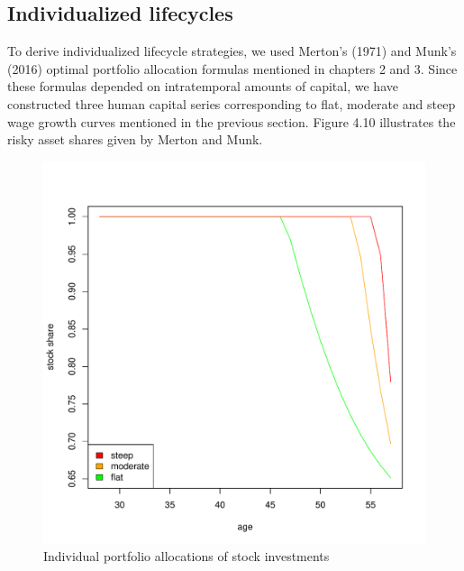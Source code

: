 \subsection{Individualized lifecycles}

To derive individualized lifecycle strategies, we used Merton's (1971) and Munk's (2016) optimal portfolio allocation formulas mentioned in chapters 2 and 3. Since these formulas depended on intratemporal amounts of capital, we have constructed three human capital series corresponding to flat, moderate and steep wage growth curves mentioned in the previous section. Figure 4.10 illustrates the risky asset shares given by Merton and Munk. 

\begin{figure}[h]
	\centering
	\includegraphics[scale=0.6]{figs/individuals.pdf}
	\caption{Individual portfolio allocations of stock investments}
\end{figure}
